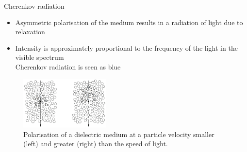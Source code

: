 \documentclass[aspectratio=1610, 10pt]{beamer}
\begin{document}
\begin{frame}{Cherenkov radiation}
  \begin{itemize}
    \item Asymmetric polarisation of the medium results in a radiation of light due to relaxation
    \medskip
    \item Intensity is approximately proportional to the frequency of the light in the visible spectrum \\
    \rightarrow Cherenkov radiation is seen as blue
    \medskip
  \end{itemize}
  \begin{figure}
    \includegraphics[width=0.4\textwidth]{images/polarisation.png}
    \caption{Polarisation of a dielectric medium at a particle velocity smaller (left) and greater (right) than the speed of light.}
  \end{figure}
\end{frame}
\end{document}
